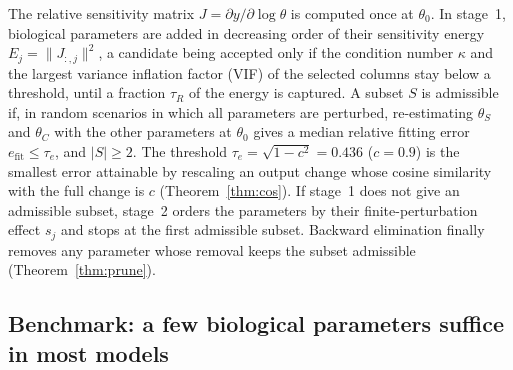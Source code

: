 \documentclass[pdflatex,sn-nature]{sn-jnl}
\theoremstyle{plain}
\begin{document}
The relative sensitivity matrix $J=\partial y/\partial\log\theta$ is computed once at $\theta_0$. In stage~1, biological parameters are added in decreasing order of their sensitivity energy $E_j=\|J_{:,j}\|^2$, a candidate being accepted only if the condition number $\kappa$ and the largest variance inflation factor (VIF) of the selected columns stay below a threshold, until a fraction $\tau_R$ of the energy is captured. A subset $S$ is admissible if, in random scenarios in which all parameters are perturbed, re-estimating $\theta_S$ and $\theta_C$ with the other parameters at $\theta_0$ gives a median relative fitting error $e_{\mathrm{fit}}\le\tau_e$, and $|S|\ge2$. The threshold $\tau_e=\sqrt{1-c^2}=0.436$ ($c=0.9$) is the smallest error attainable by rescaling an output change whose cosine similarity with the full change is $c$ (Theorem~\ref{thm:cos}). If stage~1 does not give an admissible subset, stage~2 orders the parameters by their finite-perturbation effect $s_j$ and stops at the first admissible subset. Backward elimination finally removes any parameter whose removal keeps the subset admissible (Theorem~\ref{thm:prune}).


\subsection*{Benchmark: a few biological parameters suffice in most models}\label{sec:benchmark}
\end{document}
